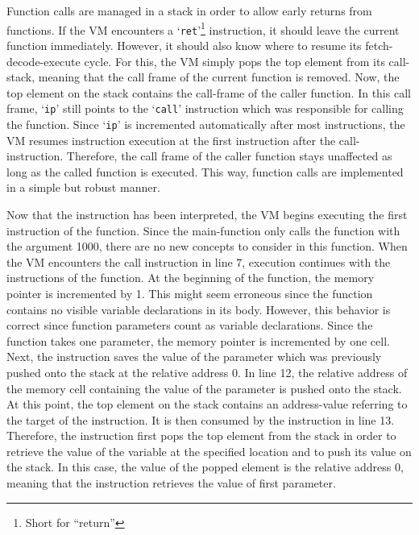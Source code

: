 Function calls are managed in a stack in order to allow early returns from functions.
If the VM encounters a `\texttt{ret}'\footnote{Short for \enquote{return}} instruction, it should leave the current function immediately.
However, it should also know where to resume its fetch-decode-execute cycle.
For this, the VM simply pops the top element from its call-stack, meaning that the call frame of the current function is removed.
Now, the top element on the stack contains the call-frame of the caller function.
In this call frame, `\texttt{ip}' still points to the `\texttt{call}' instruction which was responsible for calling the function.
Since `\texttt{ip}' is incremented automatically after most instructions, the VM resumes instruction execution at the first instruction after the call-instruction.
Therefore, the call frame of the caller function stays unaffected as long as the called function is executed.
This way, function calls are implemented in a simple but robust manner.


Now that the  instruction has been interpreted, the VM begins executing the first instruction of the  function.
Since the main-function only calls the  function with the argument 1000, there are no new concepts to consider in this function.
When the VM encounters the call instruction in line 7, execution continues with the instructions of the  function.
At the beginning of the  function, the memory pointer is incremented by 1.
This might seem erroneous since the  function contains no visible variable declarations in its body.
However, this behavior is correct since function parameters count as variable declarations.
Since the function takes one parameter, the memory pointer is incremented by one cell.
Next, the  instruction saves the value of the parameter which was previously pushed onto the stack at the relative address 0.
In line 12, the relative address of the memory cell containing the value of the parameter is pushed onto the stack.
At this point, the top element on the stack contains an address-value referring to the target of the  instruction.
It is then consumed by the  instruction in line 13.
Therefore, the instruction first pops the top element from the stack in order to
retrieve the value of the variable at the specified location and to push its value on the stack.
In this case, the value of the popped element is the relative address 0, meaning that the instruction retrieves the value of first parameter.

